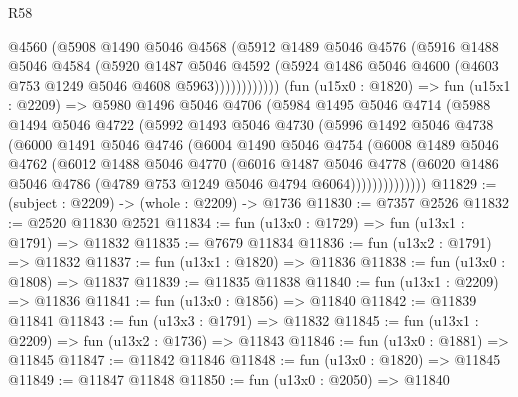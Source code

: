 \begin{lexlean}{R58}
\begin{coremodule}
                    @4560
                    (@5908
                      @1490
                      @5046
                      @4568
                      (@5912
                        @1489
                        @5046
                        @4576
                        (@5916
                          @1488
                          @5046
                          @4584
                          (@5920
                            @1487
                            @5046
                            @4592
                            (@5924 @1486 @5046 @4600 (@4603 @753 @1249 @5046 @4608 @5963))))))))))))
        (fun (u15x0 : @1820) =>
        fun (u15x1 : @2209) =>
        @5980
          @1496
          @5046
          @4706
          (@5984
            @1495
            @5046
            @4714
            (@5988
              @1494
              @5046
              @4722
              (@5992
                @1493
                @5046
                @4730
                (@5996
                  @1492
                  @5046
                  @4738
                  (@6000
                    @1491
                    @5046
                    @4746
                    (@6004
                      @1490
                      @5046
                      @4754
                      (@6008
                        @1489
                        @5046
                        @4762
                        (@6012
                          @1488
                          @5046
                          @4770
                          (@6016
                            @1487
                            @5046
                            @4778
                            (@6020
                              @1486
                              @5046
                              @4786
                              (@4789 @753 @1249 @5046 @4794 @6064))))))))))))))
@11829 := (subject : @2209) -> (whole : @2209) -> @1736
@11830 := @7357 @2526
@11832 := @2520 @11830 @2521
@11834 := fun (u13x0 : @1729) => fun (u13x1 : @1791) => @11832
@11835 := @7679 @11834
@11836 := fun (u13x2 : @1791) => @11832
@11837 := fun (u13x1 : @1820) => @11836
@11838 := fun (u13x0 : @1808) => @11837
@11839 := @11835 @11838
@11840 := fun (u13x1 : @2209) => @11836
@11841 := fun (u13x0 : @1856) => @11840
@11842 := @11839 @11841
@11843 := fun (u13x3 : @1791) => @11832
@11845 := fun (u13x1 : @2209) => fun (u13x2 : @1736) => @11843
@11846 := fun (u13x0 : @1881) => @11845
@11847 := @11842 @11846
@11848 := fun (u13x0 : @1820) => @11845
@11849 := @11847 @11848
@11850 := fun (u13x0 : @2050) => @11840

\end{coremodule}
\end{lexlean}

